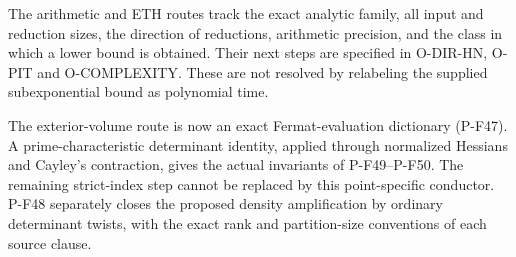 \documentclass[11pt,a4paper]{article}
\begin{document}
The arithmetic and ETH routes track the exact analytic family, all input
and reduction sizes, the direction of reductions, arithmetic precision,
and the class in which a lower bound is obtained. Their next steps are
specified in O-DIR-HN, O-PIT and O-COMPLEXITY. These are not resolved by
relabeling the supplied subexponential bound as polynomial time.

The exterior-volume route is now an exact Fermat-evaluation
dictionary (P-F47). A prime-characteristic determinant identity,
applied through normalized Hessians and Cayley's contraction,
gives the actual invariants of P-F49--P-F50. The remaining
strict-index step cannot be replaced by this point-specific
conductor. P-F48 separately closes the proposed density
amplification by ordinary determinant twists, with the exact
rank and partition-size conventions of each source clause.
\end{document}
